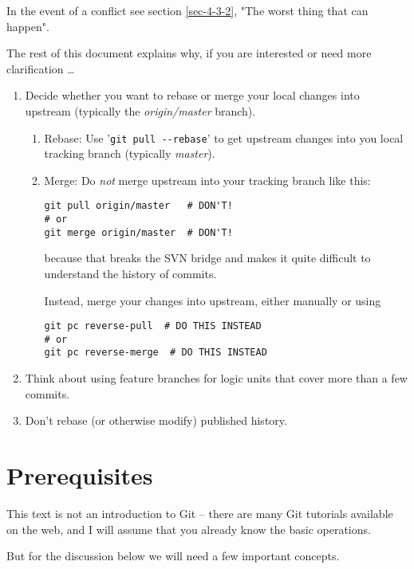 \documentclass[12pt,pdftex]{article}
\begin{document}
In the event of a conflict see section \ref{sec-4-3-2}, "The worst thing
that can happen".

The rest of this document explains why, if you are interested or need more
clarification \ldots

\begin{enumerate}
\item Decide whether you want to rebase or merge your local changes into
upstream (typically the \emph{origin/master} branch).

\begin{enumerate}
\item Rebase: Use '\texttt{git pull -{}-rebase}' to get upstream changes into you
local tracking branch (typically \emph{master}).

\item Merge: Do \emph{not} merge upstream into your tracking branch like this:
\begin{lstlisting}
git pull origin/master   # DON'T!
# or
git merge origin/master  # DON'T!
\end{lstlisting}
because that breaks the SVN bridge and makes it quite difficult to
understand the history of commits.

Instead, merge your changes into upstream, either manually or
using
\lstset{frame=single,basicstyle=\ttfamily\footnotesize,language=sh,label= ,caption= ,captionpos=b,numbers=none}
\begin{lstlisting}
git pc reverse-pull  # DO THIS INSTEAD
# or
git pc reverse-merge  # DO THIS INSTEAD
\end{lstlisting}
\end{enumerate}

\item Think about using feature branches for logic units that cover more
than a few commits.

\item Don't rebase (or otherwise modify) published history.
\end{enumerate}


\section{Prerequisites}
\label{sec-2}

This text is not an introduction to Git – there are many Git tutorials
available on the web, and I will assume that you already know the basic
operations.

But for the discussion below we will need a few important concepts.
\end{document}
